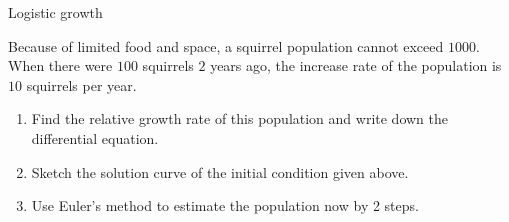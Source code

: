 \begin{frame}{Logistic growth}

\begin{example}
Because of limited food and space, a squirrel population cannot exceed
\alert<2>{$1000$}. When there were $100$ squirrels $2$ years ago,
the \alert<2>{increase rate} of the population is $10$ squirrels
per year.
\begin{enumerate}
\item Find the \alert<2>{relative growth rate} of this population and write
down the differential equation.
\item Sketch the solution curve of the initial condition given above.
\item Use \alert<2>{Euler's method} to estimate the population now by 2
steps.
\end{enumerate}

\end{example}

\end{frame}



